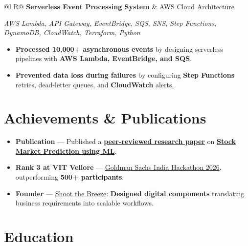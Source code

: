 \documentclass[a4paper,11pt]{article}
\newcommand{\subheading}[1]{\textbf{#1}}
\newcommand{\meta}[1]{{\fontsize{10}{12}\selectfont\textcolor[HTML]{3A3A3A}{#1}}}
\newcommand{\techstack}[1]{{\fontsize{10}{12}\selectfont\textcolor[HTML]{1A1A1A}{\textit{#1}}}}
\newcommand{\ulink}[2]{\href{#1}{#2}}
\begin{document}
\begin{tabularx}{\linewidth}{@{}l R@{}}
\subheading{\ulink{https://github.com/su-jin1425/Serverless-Event-Processing-System}{Serverless Event Processing System}} & \meta{AWS Cloud Architecture}
\end{tabularx}
\techstack{AWS Lambda, API Gateway, EventBridge, SQS, SNS, Step Functions, DynamoDB, CloudWatch, Terraform, Python}
\begin{itemize}[nosep, leftmargin=1.5em, itemsep=2pt, topsep=2pt]
  \item {\color[HTML]{0A0A0A}\fontsize{11}{14}\selectfont \textbf{Processed 10,000+ asynchronous events} by designing serverless pipelines with \textbf{AWS Lambda, EventBridge, and SQS}.}
  \item {\color[HTML]{0A0A0A}\fontsize{11}{14}\selectfont \textbf{Prevented data loss during failures} by configuring \textbf{Step Functions} retries, dead-letter queues, and \textbf{CloudWatch} alerts.}
\end{itemize}

\section{Achievements \& Publications}
\vspace{2pt}

\begin{itemize}[nosep, leftmargin=1.5em, itemsep=2pt, topsep=2pt]
  \item {\color[HTML]{0A0A0A}\fontsize{11}{14}\selectfont \textbf{Publication} --- Published a \ulink{https://www.elruha.org/_files/ugd/614b1f_6b95e1b697bf452b9907ba46e0151c05.pdf\#page=774}{\textbf{peer-reviewed research paper}} on \ulink{https://github.com/su-jin1425/Set-Project}{\textbf{Stock Market Prediction using ML}}.}
  \item {\color[HTML]{0A0A0A}\fontsize{11}{14}\selectfont \textbf{Rank 3 at VIT Vellore} --- \ulink{https://www.hackerrank.com/contests/goldman-sachs-india-hackathon-2026-cs/leaderboard}{Goldman Sachs India Hackathon 2026}, outperforming \textbf{500+ participants}.}
  \item {\color[HTML]{0A0A0A}\fontsize{11}{14}\selectfont \textbf{Founder} --- \ulink{https://shoot-the-breeze.vercel.app}{Shoot the Breeze}: \textbf{Designed digital components} translating business requirements into scalable workflows.}
\end{itemize}

\section{Education}
\vspace{2pt}
\end{document}
